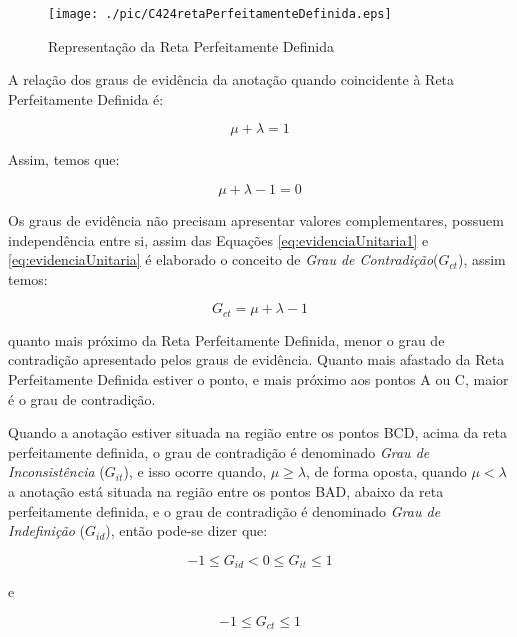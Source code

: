 \begin{figure}[!htb]
\center\texttt{[image: ./pic/C424retaPerfeitamenteDefinida.eps]}
\caption{Representação da Reta Perfeitamente Definida}
\label{fig:retaPerfeitamenteDefinida}
\end{figure}

A relação dos graus de evidência da anotação quando coincidente à Reta Perfeitamente Definida é: 

\begin{center}
\begin{equation}
\mu + \lambda = 1
\label{eq:evidenciaUnitaria1}
\end{equation}
\end{center}

Assim, temos que:

\begin{center}
\begin{equation}
\mu + \lambda - 1 = 0
\label{eq:evidenciaUnitaria}
\end{equation}
\end{center}


Os graus de evidência não precisam apresentar valores complementares, possuem independência entre si, assim das Equações  
\ref{eq:evidenciaUnitaria1} e 
\ref{eq:evidenciaUnitaria} 
é elaborado o conceito de 
\emph{Grau de Contradição}($G_{ct}$), 
assim temos: 

\begin{center}
\begin{equation}
G _{ct} = \mu + \lambda - 1
\label{eq:grauIncerteza}
\end{equation}
\end{center}

quanto mais próximo da Reta Perfeitamente Definida, menor o grau de contradição apresentado pelos graus de evidência. 
Quanto mais afastado da Reta Perfeitamente Definida estiver o ponto, e mais próximo aos pontos A ou C, maior é o grau de contradição. 

Quando a anotação estiver situada na região entre os pontos BCD, acima da reta perfeitamente definida, o grau de contradição é denominado 
\emph{Grau de Inconsistência} ($G_{it}$), 
e isso ocorre quando, $\mu \ge \lambda $, de forma oposta, quando $\mu < \lambda $ a anotação está situada na região entre os pontos BAD, abaixo da reta perfeitamente definida, e o grau de contradição é denominado 
\emph{Grau de Indefinição} ($G_{id}$), 
então pode-se dizer que:

\begin{center}
\begin{equation}
-1 \le G _{id}  <  0 \le G _{it} \le 1
\label{eq:grauInconsistenciaIndefinicao}
\end{equation}
\end{center}
e
\begin{center}
\begin{equation}
-1 \le G _{ct} \le 1
\label{eq:grauInconsistenciaIndefinicao1}
\end{equation}
\end{center}



